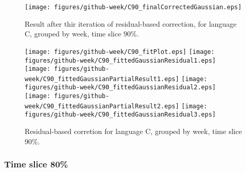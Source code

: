 \begin{figure}[]
\centering
{\texttt{[image: figures/github-week/C90\_finalCorrectedGaussian.eps]}}
\caption{Result after thir iteration of residual-based correction, for language C, grouped by week, time slice 90\%.}
\end{figure}


\begin{figure}[hb]
\centering
{}
{\texttt{[image: figures/github-week/C90\_fitPlot.eps]}}
{\texttt{[image: figures/github-week/C90\_fittedGaussianResidual1.eps]}}
{\texttt{[image: figures/github-week/C90\_fittedGaussianPartialResult1.eps]}}
{\texttt{[image: figures/github-week/C90\_fittedGaussianResidual2.eps]}}
{\texttt{[image: figures/github-week/C90\_fittedGaussianPartialResult2.eps]}}
{\texttt{[image: figures/github-week/C90\_fittedGaussianResidual3.eps]}}
\caption{Residual-based corretion for language C, grouped by week, time slice 90\%.}
\end{figure}


\clearpage 
\newpage 


\FloatBarrier

\subsubsection{Time slice 80\%}

